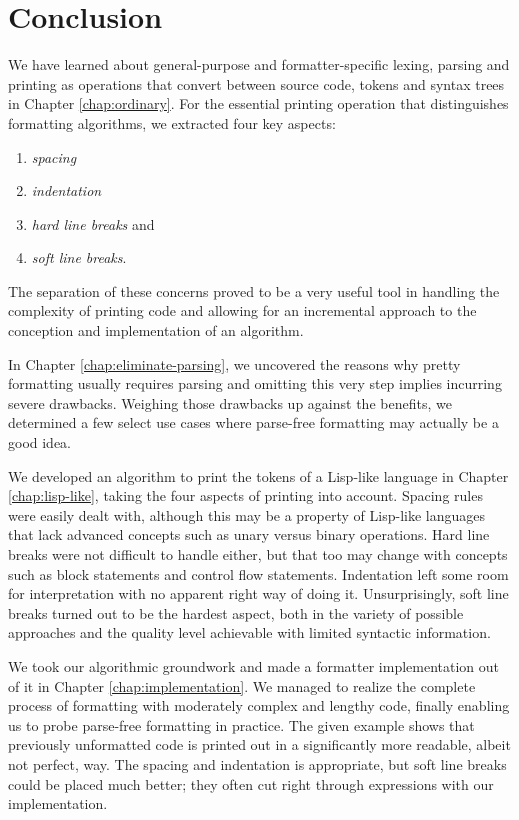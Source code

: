 \chapter{Conclusion}
We have learned about general-purpose and formatter-specific
lexing, parsing and printing as operations that convert between
source code, tokens and syntax trees in Chapter \ref{chap:ordinary}.
For the essential printing operation that distinguishes formatting algorithms,
we extracted four key aspects:
\begin{enumerate}
  \item{\textit{spacing}}
  \item{\textit{indentation}}
  \item{\textit{hard line breaks}} and
  \item{\textit{soft line breaks}}.
\end{enumerate}
The separation of these concerns proved to be a very useful tool in
handling the complexity of printing code and
allowing for an incremental approach to
the conception and implementation of an algorithm.

In Chapter \ref{chap:eliminate-parsing},
we uncovered the reasons why
pretty formatting usually requires parsing and
omitting this very step implies incurring severe drawbacks.
Weighing those drawbacks up against the benefits,
we determined a few select use cases where
parse-free formatting may actually be a good idea.

We developed an algorithm to print the
tokens of a Lisp-like language in Chapter \ref{chap:lisp-like},
taking the four aspects of printing into account.
Spacing rules were easily dealt with,
although this may be a property of Lisp-like languages
that lack advanced concepts such as
unary versus binary operations.
Hard line breaks were not difficult to handle either,
but that too may change with concepts
such as block statements and control flow statements.
Indentation left some room for interpretation
with no apparent right way of doing it.
Unsurprisingly, soft line breaks turned out to be the hardest aspect,
both in the variety of possible approaches
and the quality level achievable with limited syntactic information.

We took our algorithmic groundwork and
made a formatter implementation out of it in Chapter \ref{chap:implementation}.
We managed to realize the complete process of formatting
with moderately complex and lengthy code,
finally enabling us to probe parse-free formatting in practice.
The given example shows that previously unformatted code
is printed out in a significantly more readable,
albeit not perfect, way.
The spacing and indentation is appropriate,
but soft line breaks could be placed much better;
they often cut right through expressions with our implementation.

